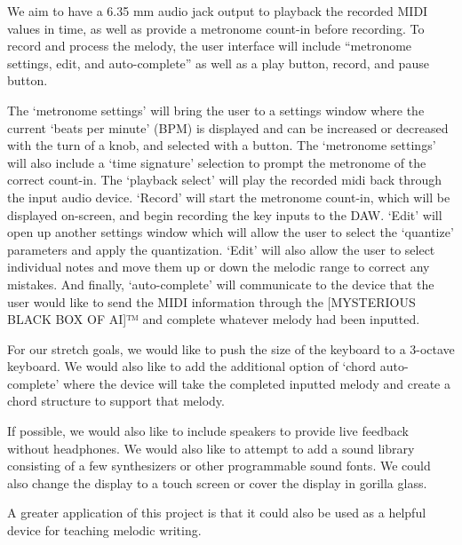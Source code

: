 We aim to have a 6.35 mm audio jack output to playback the recorded MIDI values in
time, as well as provide a metronome count-in before recording. To record and process the
melody, the user interface will include “metronome settings, edit, and auto-complete” as well
as a play button, record, and pause button.

The ‘metronome settings’ will bring the user to a settings window where the current
‘beats per minute’ (BPM) is displayed and can be increased or decreased with the turn of a
knob, and selected with a button. The ‘metronome settings’ will also include a ‘time signature’
selection to prompt the metronome of the correct count-in. The ‘playback select’ will play the
recorded midi back through the input audio device. ‘Record’ will start the metronome count-in,
which will be displayed on-screen, and begin recording the key inputs to the DAW. ‘Edit’ will
open up another settings window which will allow the user to select the ‘quantize’ parameters
and apply the quantization. ‘Edit’ will also allow the user to select individual notes and move
them up or down the melodic range to correct any mistakes. And finally, ‘auto-complete’ will
communicate to the device that the user would like to send the MIDI information through the
[MYSTERIOUS BLACK BOX OF AI]™ and complete whatever melody had been inputted.

For our stretch goals, we would like to push the size of the keyboard to a 3-octave
keyboard. We would also like to add the additional option of ‘chord auto-complete’ where the
device will take the completed inputted melody and create a chord structure to support that
melody.

If possible, we would also like to include speakers to provide live feedback without
headphones. We would also like to attempt to add a sound library consisting of a few
synthesizers or other programmable sound fonts. We could also change the display to a touch
screen or cover the display in gorilla glass.

A greater application of this project is that it could also be used as a helpful device for
teaching melodic writing.
